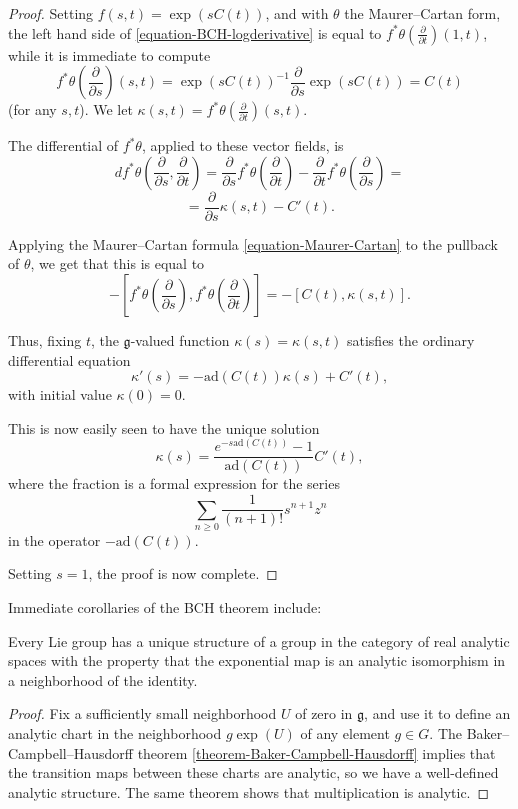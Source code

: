 \begin{proof}
Setting $f(s,t) = \exp(sC(t))$, and with $\theta$ the Maurer--Cartan form, the left hand side of \eqref{equation-BCH-logderivative} is equal to $f^*\theta(\frac{\partial}{\partial t}) (1,t)$, while it is immediate to compute 
$$ f^*\theta(\frac{\partial}{\partial s}) (s,t) = \exp(s C(t))^{-1} \frac{\partial}{\partial s} \exp( sC(t)) = C(t)$$
(for any $s,t$). We let $\kappa(s,t) = f^*\theta(\frac{\partial}{\partial t}) (s,t)$.

The differential of $f^*\theta$, applied to these vector fields, is $$ df^*\theta(\frac{\partial}{\partial s}, \frac{\partial}{\partial t}) = \frac{\partial}{\partial s} f^*\theta(\frac{\partial}{\partial t}) - \frac{\partial}{\partial t} f^*\theta (\frac{\partial}{\partial s}) = $$
$$ = \frac{\partial}{\partial s} \kappa (s,t) - C'(t).$$

Applying the Maurer--Cartan formula \eqref{equation-Maurer-Cartan} to the pullback of $\theta$, we get that this is equal to 
$$ -[f^*\theta(\frac{\partial}{\partial s}), f^*\theta(\frac{\partial}{\partial t})] = - [C(t), \kappa(s,t)].$$

Thus, fixing $t$, the $\mathfrak g$-valued function $\kappa(s)=\kappa(s,t)$ satisfies the ordinary differential equation
$$ \kappa'(s) = - \text{ad}(C(t)) \kappa(s) + C'(t), $$
with initial value $\kappa(0)=0$.

This is now easily seen to have the unique solution
$$ \kappa(s) = \frac{e^{-s\text{ad} (C(t))} -1}{\text{ad}(C(t))}  C'(t),$$
where the fraction is a formal expression for the series 
$$\sum_{n\ge 0} \frac{1}{(n+1)!} s^{n+1} z^n$$
in the operator $-\text{ad}(C(t))$.

Setting $s=1$, the proof is now complete.


\end{proof}


Immediate corollaries of the BCH theorem include:

\begin{proposition}
\label{proposition-analyticity}
Every Lie group has a unique structure of a group in the category of real analytic spaces with the property that the exponential map is an analytic isomorphism in a neighborhood of the identity. 
\end{proposition}

\begin{proof}
Fix a sufficiently small neighborhood $U$ of zero in $\mathfrak g$, and use it to define an analytic chart in the neighborhood $g \exp(U)$ of any element $g\in G$. The Baker--Campbell--Hausdorff theorem \ref{theorem-Baker-Campbell-Hausdorff} implies that the transition maps between these charts are analytic, so we have a well-defined analytic structure. The same theorem shows that multiplication is analytic. 
\end{proof}




